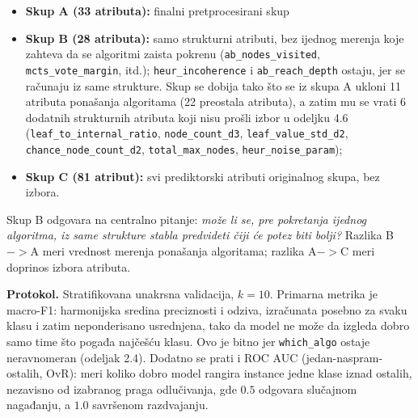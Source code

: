 \documentclass[12pt, a4paper]{article}
\begin{document}
\begin{itemize}[noitemsep]
    \item \textbf{Skup A (33 atributa):} finalni pretprocesirani skup
    \item \textbf{Skup B (28 atributa):} samo strukturni atributi, bez ijednog merenja koje
    zahteva da se algoritmi zaista pokrenu (\texttt{ab\_nodes\_visited},
    \texttt{mcts\_vote\_margin},
    itd.); \texttt{heur\_incoherence} i \texttt{ab\_reach\_depth} ostaju, jer se računaju iz
    same strukture. Skup se dobija tako što se iz skupa A ukloni 11 atributa ponašanja
    algoritama (22 preostala atributa), a zatim mu se vrati 6 dodatnih strukturnih atributa
    koji nisu prošli izbor u odeljku 4.6 (\texttt{leaf\_to\_internal\_ratio},
    \texttt{node\_count\_d3}, \texttt{leaf\_value\_std\_d2}, \texttt{chance\_node\_count\_d2},
    \texttt{total\_max\_nodes}, \texttt{heur\_noise\_param});
    \item \textbf{Skup C (81 atribut):} svi prediktorski atributi originalnog skupa, bez
    izbora.
\end{itemize}

Skup B odgovara na centralno pitanje: \textit{može li se, pre pokretanja ijednog algoritma,
iz same strukture stabla predvideti čiji će potez biti bolji?} Razlika B$->$A meri vrednost
merenja ponašanja algoritama; razlika A$->$C meri doprinos izbora atributa.

\textbf{Protokol.} Stratifikovana unakrsna validacija, $k{=}10$. Primarna metrika je
macro-F1: harmonijska sredina preciznosti i odziva, izračunata posebno za svaku klasu i
zatim neponderisano usrednjena, tako da model ne može da izgleda dobro samo time što
pogađa najčešću klasu. Ovo je bitno jer \texttt{which\_algo} ostaje neravnomeran (odeljak
2.4). Dodatno se prati i ROC AUC (jedan-naspram-ostalih, OvR): meri koliko dobro model
rangira instance jedne klase iznad ostalih, nezavisno od izabranog praga odlučivanja, gde
$0.5$ odgovara slučajnom nagađanju, a $1.0$ savršenom razdvajanju.
\end{document}
